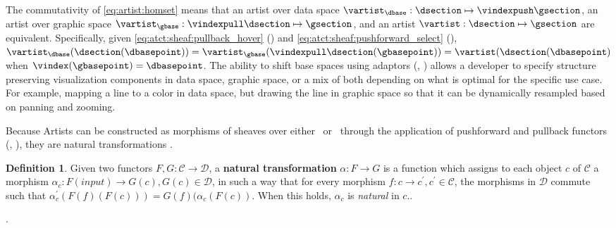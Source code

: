 \documentclass[review]{vgtc}
\theoremstyle{definition}
\newtheorem{definition}{Definition}[section]
\theoremstyle{remark}
\begin{document}
The commutativity of \autoref{eq:artist:homset} means that an artist over data space $\vartist_{\dbase}: \dsection \mapsto \vindexpush \gsection$, an artist over graphic space $\vartist_{\gbase}: \vindexpull \dsection \mapsto \gsection$, and an artist $\vartist: \dsection \mapsto \gsection$ are equivalent. Specifically, given \autoref{eq:atct:sheaf:pullback_hover} (\vindexpull) and \autoref{eq:atct:sheaf:pushforward_select} (\vindexpush), $\vartist_{\dbase}(\dsection(\dbasepoint)) = \vartist_{\gbase}(\vindexpull\dsection(\gbasepoint)) = \vartist(\dsection(\dbasepoint)$ when $\vindex(\gbasepoint) = \dbasepoint$. The ability to shift base spaces using adaptors (\vindexpush, \vindexpull) allows a developer to specify structure preserving visualization components in data space, graphic space, or a mix of both depending on what is optimal for the specific use case. For example, mapping a line to a color in data space, but drawing the line in graphic space so that it can be dynamically resampled based on panning and zooming.

Because Artists can be constructed as morphisms of sheaves over either \dbase\ or \gbase\ through the application of pushforward and pullback functors (\vindexpush, \vindexpull), they are natural transformations \cite{bradleyWhatNaturalTransformation}.
\begin{definition}\label{def:natural-transform}
  Given two functors $F, G: \mathcal{C}\rightarrow \mathcal{D}$, a \textbf{natural transformation} $\alpha: F \rightarrow G$ is a function which assigns to each object $c$ of $\mathcal{C}$ a morphism $\alpha_c:F(input) \rightarrow G(c), G(c) \in \mathcal{D}$, in such a way that for every morphism $f:c \rightarrow c^\prime, c^\prime \in \mathcal{C}$, the morphisms in $\mathcal{D}$ commute such that $\alpha_c^{\prime}(F(f)(F(c))) = G(f)(\alpha_c(F(c))$. When this holds, $\alpha_{c}$ is \textit{natural} in $c$.\cite{maclaneCategoriesWorkingMathematician2013}.
\end{definition}.
\end{document}
